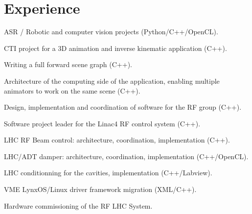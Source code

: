 \documentclass[a4paper]{deedy-resume} %
\begin{document}
\begin{minipage}[t]{0.66\textwidth} %


\section{Experience}


\vspace{\topsep} %
\begin{tightitemize}
\item ASR / Robotic and computer vision projects (Python/C++/OpenCL).
\end{tightitemize}

\sectionspace %



\begin{tightitemize}
\item CTI project for a 3D animation and inverse kinematic application (C++).
\item Writing a full forward scene graph (C++).
\item Architecture of the computing side of the application, enabling multiple
    animators to work on the same scene (C++).
\end{tightitemize}

\sectionspace %



\begin{tightitemize}
\item Design, implementation and coordination of software for the RF group (C++).
\item Software project leader for the Linac4 RF control system (C++).
\item LHC RF Beam control: architecture, coordination, implementation (C++).
\item LHC/ADT damper: architecture, coordination, implementation (C++/OpenCL).
\item LHC conditionning for the cavities, implementation (C++/Labview).
\item VME LynxOS/Linux driver framework migration (XML/C++).
\item Hardware commissioning of the RF LHC System.
\end{tightitemize}


\end{minipage}
\end{document}
